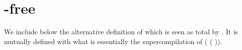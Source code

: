 \section{\assertTotal{}-free }\label{sec:safefold}

We include below the alternative definition of  which
is seen as total by \idris{}. It is mutually defined with what is essentially
the supercompilation of
(\IdrisKeyword{\textbackslash}  \IdrisKeyword{=>}   ( )).

